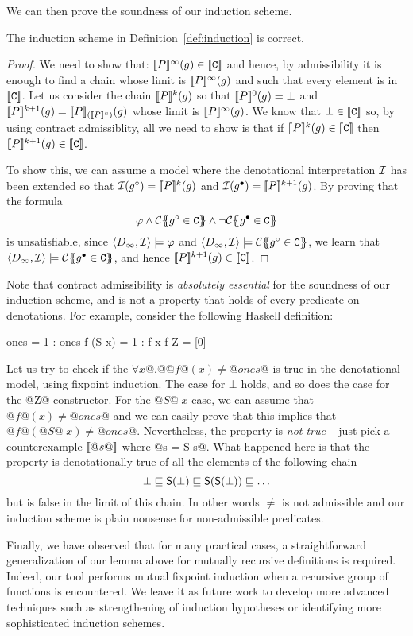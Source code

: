 We can then prove the soundness of our induction scheme.
\begin{theorem} The induction scheme in Definition~\ref{def:induction} is correct. \end{theorem}
\begin{proof} We need to show that:
$\dbrace{P}^{\infty}(g) \in \dbrace{\Ct}$ and hence, by admissibility it is enough to find
a chain whose limit is $\dbrace{P}^{\infty}(g)$ and such that every element is in $\dbrace{\Ct}$.
Let us consider the chain $\dbrace{P}^{k}(g)$ so that $\dbrace{P}^0(g) = \bot$ and
$\dbrace{P}^{k+1}(g) = \dbrace{P}_{(\dbrace{P}^{k})}(g)$ whose limit is $\dbrace{P}^{\infty}(g)$. We
know that $\bot \in \dbrace{\Ct}$ so, by using contract admissiblity, all we need to show is
that if $\dbrace{P}^{k}(g) \in \dbrace{\Ct}$ then $\dbrace{P}^{k+1}(g) \in \dbrace{\Ct}$.

To show this, we can assume a model where the denotational interpretation ${\cal I}$ has been
extended so that ${\cal I}(g^{\circ}) = \dbrace{P}^{k}(g)$ and ${\cal I}(g^{\bullet}) = \dbrace{P}^{k+1}(g)$.
By proving that the formula
\[ \phi \land \ctrans{}{}{g^{\circ} \in \Ct} \land \neg \ctrans{}{}{g^{\bullet} \in \Ct} \]
is unsatisfiable, since $\langle D_{\infty},{\cal I}\rangle \models \phi$ and
$\langle D_{\infty},{\cal I}\rangle \models \ctrans{}{}{g^{\circ} \in \Ct}$, we learn
that $\langle D_{\infty},{\cal I}\rangle \models \ctrans{}{}{g^{\bullet} \in \Ct}$,
and hence $\dbrace{P}^{k+1}(g) \in \dbrace{\Ct}$.
\end{proof}

Note that contract admissibility is {\em absolutely essential} for the
soundness of our induction scheme, and is not a property that holds of
every predicate on denotations. For example, consider the following
Haskell definition:
\begin{code}
  ones = 1 : ones
  f (S x) = 1 : f x
  f Z     = [0]
\end{code}
Let us try to check if the $\forall x @.@ @f@(x) \neq @ones@$ is true in
the denotational model, using fixpoint induction. The case for $\bot$ holds,
and so does the case for the @Z@ constructor. For the $@S@\;x$ case, we can
assume that $@f@(x) \neq @ones@$ and we can easily prove that this implies that
$@f@(@S@\;x) \neq @ones@$. Nevertheless, the property is {\em not true} -- just pick
a counterexample $\dbrace{@s@}$ where @s = S s@. What happened here is that the property
is denotationally true of all the elements of the following chain
\[ \bot \sqsubseteq \injK{S}{\bot} \sqsubseteq \injK{S}{\injK{S}{\bot}} \sqsubseteq \ldots \]
but is false in the limit of this chain. In other words $\neq$ is not admissible and our
induction scheme is plain nonsense for non-admissible predicates.

Finally, we have observed that for many practical cases, a
straightforward generalization of our lemma above for mutually
recursive definitions is required. Indeed, our tool performs mutual
fixpoint induction when a recursive group of functions is
encountered. We leave it as future work to develop more advanced
techniques such as strengthening of induction hypotheses or
identifying more sophisticated induction schemes.


